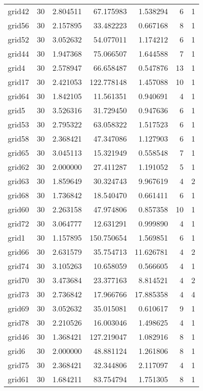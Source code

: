 \documentclass[../../../thesis.tex]{subfiles}
\begin{document}
\begin{longtable}{|l|r|r|r|r|r|r|}
grid42 & 30 & 2.804511 & 67.175983 & 1.538294 & 6 & 1 \\
grid56 & 30 & 2.157895 & 33.482223 & 0.667168 & 8 & 1 \\
grid52 & 30 & 3.052632 & 54.077011 & 1.174212 & 6 & 1 \\
grid44 & 30 & 1.947368 & 75.066507 & 1.644588 & 7 & 1 \\
grid4 & 30 & 2.578947 & 66.658487 & 0.547876 & 13 & 1 \\
grid17 & 30 & 2.421053 & 122.778148 & 1.457088 & 10 & 1 \\
grid64 & 30 & 1.842105 & 11.561351 & 0.940691 & 4 & 1 \\
grid5 & 30 & 3.526316 & 31.729450 & 0.947636 & 6 & 1 \\
grid53 & 30 & 2.795322 & 63.058322 & 1.517523 & 6 & 1 \\
grid58 & 30 & 2.368421 & 47.347086 & 1.127903 & 6 & 1 \\
grid65 & 30 & 3.045113 & 15.321949 & 0.558548 & 7 & 1 \\
grid62 & 30 & 2.000000 & 27.411287 & 1.191052 & 5 & 1 \\
grid63 & 30 & 1.859649 & 30.324743 & 9.967619 & 4 & 2 \\
grid68 & 30 & 1.736842 & 18.540470 & 0.661411 & 6 & 1 \\
grid60 & 30 & 2.263158 & 47.974806 & 0.857358 & 10 & 1 \\
grid72 & 30 & 3.064777 & 12.631291 & 0.999890 & 4 & 1 \\
grid1 & 30 & 1.157895 & 150.750654 & 1.569851 & 6 & 1 \\
grid66 & 30 & 2.631579 & 35.754713 & 11.626781 & 4 & 2 \\
grid74 & 30 & 3.105263 & 10.658059 & 0.566605 & 4 & 1 \\
grid70 & 30 & 3.473684 & 23.377163 & 8.814521 & 4 & 2 \\
grid73 & 30 & 2.736842 & 17.966766 & 17.885358 & 4 & 4 \\
grid69 & 30 & 3.052632 & 35.015081 & 0.610617 & 9 & 1 \\
grid78 & 30 & 2.210526 & 16.003046 & 1.498625 & 4 & 1 \\
grid46 & 30 & 1.368421 & 127.219047 & 1.082916 & 8 & 1 \\
grid6 & 30 & 2.000000 & 48.881124 & 1.261806 & 8 & 1 \\
grid75 & 30 & 2.368421 & 32.344806 & 2.117097 & 4 & 1 \\
grid61 & 30 & 1.684211 & 83.754794 & 1.751305 & 8 & 1 \\

\end{longtable}
\end{document}
